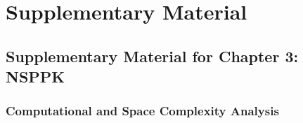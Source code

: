 \appendix
\chapter{Supplementary Material}
\label{ch:appendix}

\section{Supplementary Material for Chapter 3: NSPPK}
\label{appendix:ch3}


\subsection{Computational and Space Complexity Analysis}
\label{appendix:complexity}
